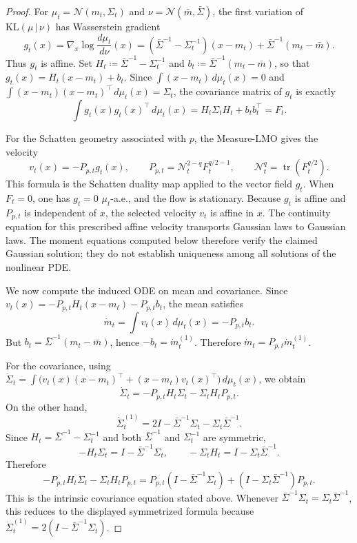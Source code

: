 \documentclass{article}
\newcommand{\tr}{\operatorname{tr}}
\newcommand{\KL}{\mathrm{KL}}
\begin{document}
\begin{proof}
For $\mu_t=\mathcal N(m_t,\Sigma_t)$ and
$\nu=\mathcal N(\bar m,\bar\Sigma)$, the first variation of
$\KL(\mu\,|\,\nu)$ has Wasserstein gradient
\[
    g_t(x)
    =
    \nabla_x\log\frac{d\mu_t}{d\nu}(x)
    =
    (\bar\Sigma^{-1}-\Sigma_t^{-1})(x-m_t)
    +
    \bar\Sigma^{-1}(m_t-\bar m).
\]
Thus $g_t$ is affine. Set
$H_t\coloneqq\bar\Sigma^{-1}-\Sigma_t^{-1}$ and
$b_t\coloneqq\bar\Sigma^{-1}(m_t-\bar m)$, so that
$g_t(x)=H_t(x-m_t)+b_t$. Since
$\int(x-m_t)\,d\mu_t(x)=0$ and
$\int(x-m_t)(x-m_t)^\top\,d\mu_t(x)=\Sigma_t$, the covariance matrix of
$g_t$ is exactly
\[
    \int g_t(x)g_t(x)^\top\,d\mu_t(x)
    =
    H_t\Sigma_tH_t+b_tb_t^\top
    =
    F_t.
\]

For the Schatten geometry associated with $p$, the Measure-LMO gives the
velocity
\[
    v_t(x)
    =
    -P_{p,t}g_t(x),
    \qquad
    P_{p,t}=\mathcal N_t^{2-q}F_t^{q/2-1},
    \qquad
    \mathcal N_t^q=\tr(F_t^{q/2}).
\]
This formula is the Schatten duality map applied to the vector field $g_t$.
When $F_t=0$, one has $g_t=0$ $\mu_t$-a.e., and the flow is stationary.
Because $g_t$ is affine and $P_{p,t}$ is independent of $x$, the selected
velocity $v_t$ is affine in $x$. The continuity equation for this prescribed
affine velocity transports Gaussian laws to Gaussian laws. The moment
equations computed below therefore verify the claimed Gaussian solution;
they do not establish uniqueness among all solutions of the nonlinear PDE.

We now compute the induced ODE on mean and covariance. Since
$v_t(x)=-P_{p,t}H_t(x-m_t)-P_{p,t}b_t$, the mean satisfies
\[
    \dot m_t
    =
    \int v_t(x)\,d\mu_t(x)
    =
    -P_{p,t}b_t.
\]
But
$b_t=\bar\Sigma^{-1}(m_t-\bar m)$, hence
$-b_t=\dot m_t^{(1)}$. Therefore
$\dot m_t=P_{p,t}\dot m_t^{(1)}$.

For the covariance, using
$\dot\Sigma_t=\int \bigl(v_t(x)(x-m_t)^\top
+(x-m_t)v_t(x)^\top\bigr)\,d\mu_t(x)$, we obtain
\[
    \dot\Sigma_t
    =
    -P_{p,t}H_t\Sigma_t-\Sigma_tH_tP_{p,t}.
\]
On the other hand,
\[
    \dot\Sigma_t^{(1)}
    =
    2I-\bar\Sigma^{-1}\Sigma_t-\Sigma_t\bar\Sigma^{-1}.
\]
Since $H_t=\bar\Sigma^{-1}-\Sigma_t^{-1}$ and both
$\bar\Sigma^{-1}$ and $\Sigma_t^{-1}$ are symmetric,
\[
    -H_t\Sigma_t
    =
    I-\bar\Sigma^{-1}\Sigma_t,
    \qquad
    -\Sigma_tH_t
    =
    I-\Sigma_t\bar\Sigma^{-1}.
\]
Therefore
\[
    -P_{p,t}H_t\Sigma_t-\Sigma_tH_tP_{p,t}
    =
    P_{p,t}(I-\bar\Sigma^{-1}\Sigma_t)
    +
    (I-\Sigma_t\bar\Sigma^{-1})P_{p,t}.
\]
This is the intrinsic covariance equation stated above. Whenever
$\bar\Sigma^{-1}\Sigma_t=\Sigma_t\bar\Sigma^{-1}$, this reduces to the
displayed symmetrized formula because
$\dot\Sigma_t^{(1)}=2(I-\bar\Sigma^{-1}\Sigma_t)$.


\end{proof}
\end{document}
